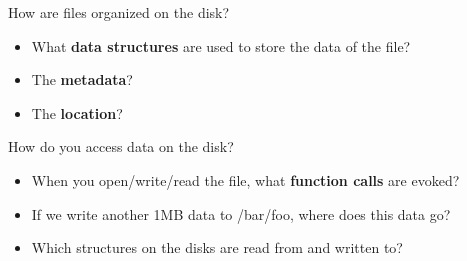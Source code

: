 	
	

\begin{slide}


    How are files organized on the disk? 
    \begin{itemize}
        \item What \textbf{data structures} are used to store the data of the file?
        \item The \textbf{metadata}?
        \item The \textbf{location}?
    \end{itemize}
    \bigskip

    How do you access data on the disk?
    \begin{itemize}
        \item When you open/write/read the file, what \textbf{function calls} are evoked?
        \item If we write another 1MB data to /bar/foo, where does this data go?
        \item Which structures on the disks are read from and written to?
    \end{itemize}

\end{slide}

